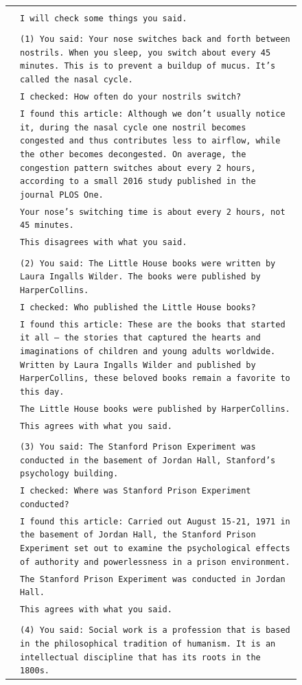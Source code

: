 { %

\newcommand{\pWidth}{5in}
\newcommand{\pStart}{\setcounter{pCount}{1}}
\newcommand{\pRow}[1]{\texttt{\fontsize{6pt}{1pt}\selectfont\color{gray}\arabic{pCount}}&\texttt{\fontsize{6pt}{1pt}\selectfont#1}\stepcounter{pCount}\\}
\newcommand{\pVar}[1]{\textbf{\{#1\}}}
\newcommand{\pBlank}{\_\_\_\_\_}
\begin{figure}[p]
\begin{center}\scriptsize
\begin{tabular}{|rp{\pWidth}|}\hline\pStart&\\
\pRow{[web] I will check some things you said.}
\pRow{}
\pRow{(1) You said: Your nose switches back and forth between nostrils. When you sleep, you switch about every 45 minutes.  This is to prevent a buildup of mucus. It's called the nasal cycle.}
\pRow{I checked: How often do your nostrils switch?}
\pRow{I found this article: Although we don't usually notice it, during the nasal cycle one nostril becomes congested and thus contributes less to airflow, while the other becomes decongested. On average, the congestion pattern switches about every 2 hours, according to a small 2016 study published in the journal PLOS One.}
\pRow{Your nose's switching time is about every 2 hours, not 45 minutes.}
\pRow{This disagrees with what you said. }
\pRow{}
\pRow{(2) You said: The Little House books were written by Laura Ingalls Wilder. The books were published by HarperCollins.}
\pRow{I checked: Who published the Little House books?}
\pRow{I found this article: These are the books that started it all -- the stories that captured the hearts and imaginations of children and young adults worldwide. Written by Laura Ingalls Wilder and published by HarperCollins, these beloved books remain a favorite to this day.}
\pRow{The Little House books were published by HarperCollins.}
\pRow{This agrees with what you said.}
\pRow{}
\pRow{(3) You said: The Stanford Prison Experiment was conducted in the basement of Jordan Hall, Stanford's psychology building.}
\pRow{I checked: Where was Stanford Prison Experiment conducted?}
\pRow{I found this article: Carried out August 15-21, 1971 in the basement of Jordan Hall, the Stanford Prison Experiment set out to examine the psychological effects of authority and powerlessness in a prison environment.}
\pRow{The Stanford Prison Experiment was conducted in Jordan Hall.}
\pRow{This agrees with what you said.}
\pRow{}
\pRow{(4) You said: Social work is a profession that is based in the philosophical tradition of humanism. It is an intellectual discipline that has its roots in the 1800s.}

\end{tabular}
\end{center}
\end{figure}}

